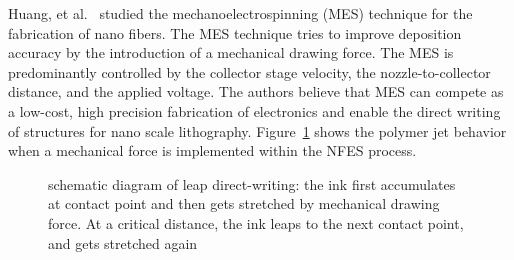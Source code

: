 \documentclass[5p,,preprint,12pt,twocolumn]{elsarticle}
\makeatletter
\def\fixFloatSize#1{}%
\makeatother
\begin{document}
Huang, et al.\unskip~\cite{527120:11974311} studied the mechanoelectrospinning (MES) technique for the fabrication of nano fibers. The MES technique tries to improve deposition accuracy by the introduction of a mechanical drawing force. The MES is predominantly controlled by the collector stage velocity, the nozzle-to-collector distance, and the applied voltage. The authors believe that MES can compete as a low-cost, high precision fabrication of electronics and enable the direct writing of structures for nano scale lithography. Figure~\ref{f-7587d8081ccc} shows the polymer jet behavior when a mechanical force is implemented within the NFES process.


\bgroup
\fixFloatSize{images/db7d3b35-fe08-422f-afe4-78e0133b489b-uhuang_00.png}
\begin{figure}[!htbp]
\centering \makeatletter{}
\makeatother 
\caption{{schematic diagram of leap direct-writing: the ink first accumulates at contact point and then gets stretched by mechanical drawing force. At a critical distance, the ink leaps to the next contact point, and gets stretched again \unskip~\protect\cite{527120:11974311}}}
\label{f-7587d8081ccc}
\end{figure}
\egroup
\end{document}
